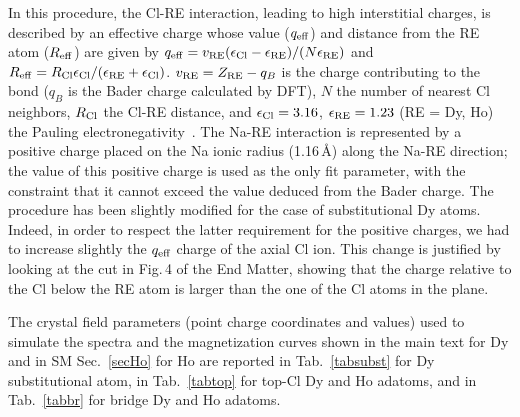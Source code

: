 {In this procedure, the Cl-RE interaction, leading to high interstitial charges, is described by an effective charge whose value ($q_{\rm eff}$) and distance from the RE atom ($R_{\rm eff}$) are given by $q_{\rm eff}=v_{\rm RE}(\epsilon_{\rm Cl}-\epsilon_{\rm RE})/(N\epsilon_{\rm RE})$ and $R_{\rm eff}=R_{\rm Cl}\epsilon_{\rm Cl}/(\epsilon_{\rm RE}+\epsilon_{\rm Cl})$. $v_{\rm RE}=Z_{\rm RE}- q_B$ is the charge contributing to the bond ($q_B$ is the Bader charge calculated by DFT), $N$ the number of nearest Cl neighbors, $R_{\rm Cl}$ the Cl-RE distance, and $\epsilon_{\rm Cl}= 3.16$, $\epsilon_{\rm RE }= 1.23$ (RE = Dy, Ho) the Pauling electronegativity~\cite{zol84}. The Na-RE interaction is represented by a positive charge placed on the Na ionic radius (1.16\,{\AA}) along the Na-RE direction; the value of this positive charge is used as the only fit parameter, with the constraint that it cannot exceed the value deduced from the Bader charge.
The procedure has been slightly modified for the case of substitutional Dy atoms. Indeed, in order to respect the latter requirement for the positive charges, we had to increase slightly the $q_{\rm eff}$ charge of the axial Cl ion. This change is justified by looking at the cut in Fig.\,4 of the End Matter, showing that the charge relative to the Cl below the RE atom is larger than the one of the Cl atoms in the plane.

The crystal field parameters (point charge coordinates and values) used to simulate the spectra and the magnetization curves shown in the main text for Dy and in SM Sec.~\ref{secHo} for Ho are reported in Tab.~\ref{tabsubst} for Dy substitutional atom, in Tab.~\ref{tabtop} for top-Cl Dy and Ho adatoms, and in Tab.~\ref{tabbr} for bridge Dy and Ho adatoms.






}
